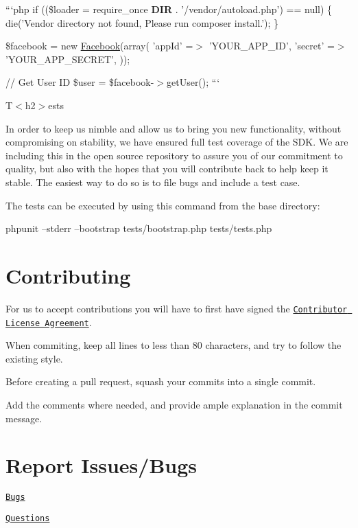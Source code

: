 ```php if ((\$loader = require\-\_\-once {\bfseries D\-I\-R} . '/vendor/autoload.php') == null) \{ die('Vendor directory not found, Please run composer install.'); \}

\$facebook = new \hyperlink{class_facebook}{Facebook}(array( 'app\-Id' =$>$ 'Y\-O\-U\-R\-\_\-\-A\-P\-P\-\_\-\-I\-D', 'secret' =$>$ 'Y\-O\-U\-R\-\_\-\-A\-P\-P\-\_\-\-S\-E\-C\-R\-E\-T', ));

// Get User I\-D \$user = \$facebook-\/$>$get\-User(); ```

T$<$h2$>$ests 

In order to keep us nimble and allow us to bring you new functionality, without compromising on stability, we have ensured full test coverage of the S\-D\-K. We are including this in the open source repository to assure you of our commitment to quality, but also with the hopes that you will contribute back to help keep it stable. The easiest way to do so is to file bugs and include a test case.

The tests can be executed by using this command from the base directory\-: \begin{DoxyVerb}phpunit --stderr --bootstrap tests/bootstrap.php tests/tests.php
\end{DoxyVerb}


\section*{Contributing }

For us to accept contributions you will have to first have signed the \href{https://developers.facebook.com/opensource/cla}{\tt Contributor License Agreement}.

When commiting, keep all lines to less than 80 characters, and try to follow the existing style.

Before creating a pull request, squash your commits into a single commit.

Add the comments where needed, and provide ample explanation in the commit message.

\section*{Report Issues/\-Bugs }

\href{https://developers.facebook.com/bugs}{\tt Bugs}

\href{http://facebook.stackoverflow.com}{\tt Questions} 